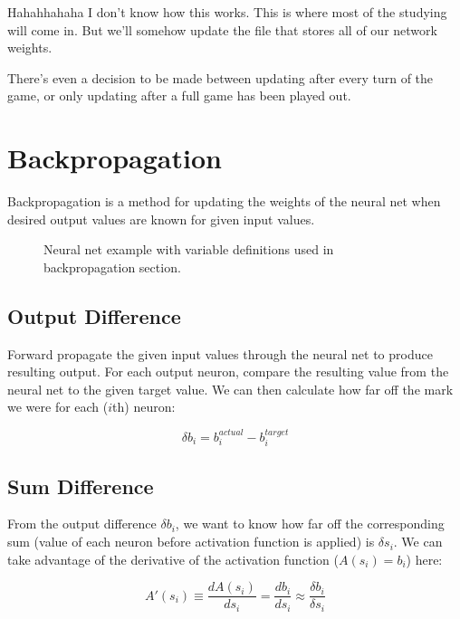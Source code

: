 \documentclass{article}[12pt]
\begin{document}
Hahahhahaha I don't know how this works. This is where most of the studying will come in. But we'll somehow update the file that stores all of our network weights.

There's even a decision to be made between updating after every turn of the game, or only updating after a full game has been played out.


\section{Backpropagation}

Backpropagation is a method for updating the weights of the neural net when desired output values are known for given input values. 


\begin{figure}
    \begin{center}
    \end{center}
    \caption{Neural net example with variable definitions used in backpropagation section.}
    \label{fig:1}
\end{figure}


\subsection{Output Difference}

Forward propagate the given input values through the neural net to produce resulting output. For each output neuron, compare the resulting value from the neural net to the given target value. We can then calculate how far off the mark we were for each ($i$th) neuron:

\begin{equation}
    \delta b_i = b_i^{actual} - b_i^{target}
    \label{eq:1}
\end{equation}


\subsection{Sum Difference}

From the output difference $\delta b_i$, we want to know how far off the corresponding sum (value of each neuron before activation function is applied) is $\delta s_i$. We can take advantage of the derivative of the activation function ($A(s_i)=b_i$) here:

\begin{equation}
    A'(s_i) \equiv \frac{dA(s_i)}{ds_i} = \frac{db_i}{ds_i} \approx \frac{\delta b_i}{\delta s_i}
    \label{eq:2}
\end{equation}
\end{document}

